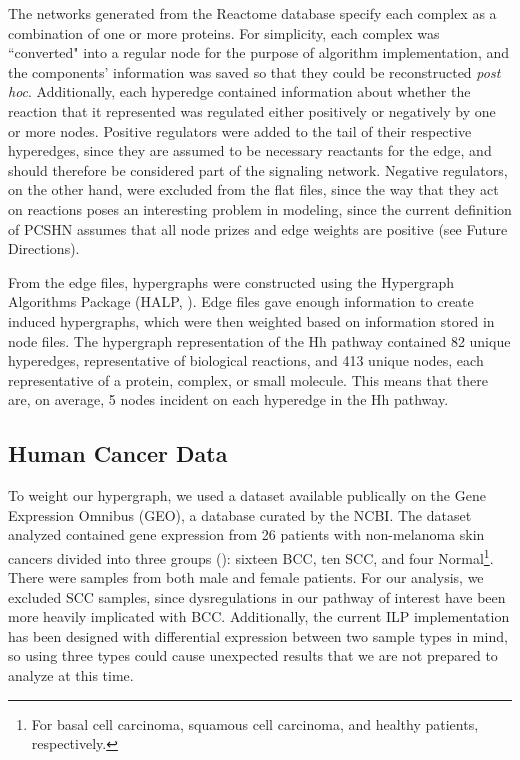 \documentclass[12pt,twoside]{reedthesis}
\theoremstyle{definition}
\begin{document}
  The networks generated from the Reactome database specify each complex as a combination of one or more proteins. For simplicity, each complex was ``converted" into a regular node for the purpose of algorithm implementation, and the components' information was saved so that they could be reconstructed \textit{post hoc}. Additionally, each hyperedge contained information about whether the reaction that it represented was regulated either positively or negatively by one or more nodes. Positive regulators were added to the tail of their respective hyperedges, since they are assumed to be necessary reactants for the edge, and should therefore be considered part of the signaling network. Negative regulators, on the other hand, were excluded from the flat files, since the way that they act on reactions poses an interesting problem in modeling, since the current definition of PCSHN assumes that all node prizes and edge weights are positive (see Future Directions).\par

  From the edge files, hypergraphs were constructed using the Hypergraph Algorithms Package (HALP, \cite{halp}). Edge files gave enough information to create induced hypergraphs, which were then weighted based on information stored in node files. The hypergraph representation of the Hh pathway contained 82 unique hyperedges, representative of biological reactions, and 413 unique nodes, each representative of a protein, complex, or small molecule. This means that there are, on average, 5 nodes incident on each hyperedge in the Hh pathway.\par

  \subsection{Human Cancer Data}

  To weight our hypergraph, we used a dataset available publically on the Gene Expression Omnibus (GEO), a database curated by the NCBI. The dataset analyzed contained gene expression from 26 patients with non-melanoma skin cancers divided into three groups (\cite{Jee2015}): sixteen BCC, ten SCC, and four Normal\footnote{For basal cell carcinoma, squamous cell carcinoma, and healthy patients, respectively.}. There were samples from both male and female patients. For our analysis, we excluded SCC samples, since dysregulations in our pathway of interest have been more heavily implicated with BCC. Additionally, the current ILP implementation has been designed with differential expression between two sample types in mind, so using three types could cause unexpected results that we are not prepared to analyze at this time.\par
\end{document}
